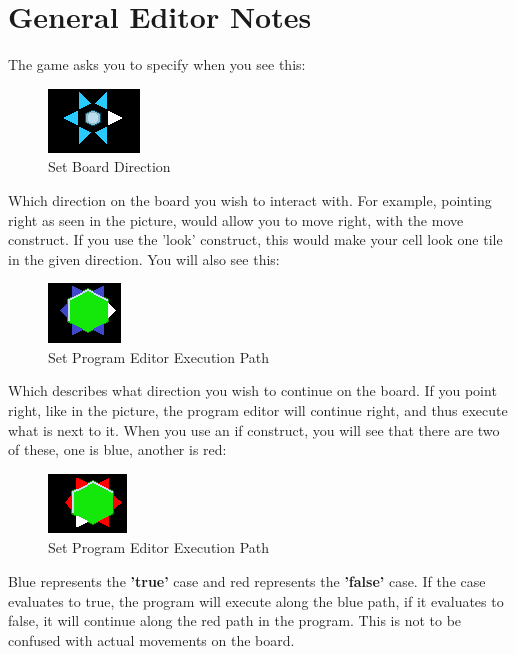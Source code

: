 \section*{General Editor Notes}

The game asks you to specify when you see this:

\begin{figure}[h]
	\centering
		\includegraphics{img/SetDirection.png}
	\caption{Set Board Direction}
	\label{fig:SetDirection}
\end{figure}

Which direction on the board you wish to interact with. For example, pointing right as seen in the picture, would allow you to move right, with the move construct. If you use the 'look' construct, this would make your cell look one tile in the given direction. You will also see this:

\begin{figure}[h]
	\centering
		\includegraphics{img/Setprogramexecution.png}
	\caption{Set Program Editor Execution Path}
	\label{fig:Setprogramexecution}
\end{figure}

Which describes what direction you wish to continue on the board. If you point right, like in the picture, the program editor will continue right, and thus execute what is next to it. When you use an if construct, you will see that there are two of these, one is blue, another is red:


\begin{figure}[h]
	\centering
		\includegraphics{img/setprogramexecutionfalse.png}
	\caption{Set Program Editor Execution Path}
	\label{fig:setprogramexecutionfalse}
\end{figure}

Blue represents the \textbf{'true'} case and red represents the \textbf{'false'} case. If the case evaluates to true, the program will execute along the blue path, if it evaluates to false, it will continue along the red path in the program. This is not to be confused with actual movements on the board.


